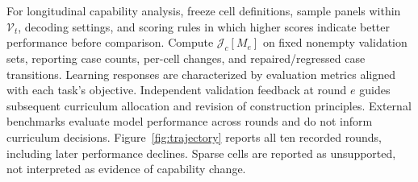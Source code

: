 For longitudinal capability analysis, freeze cell definitions, sample panels within $\mathcal V_t$, decoding settings, and scoring rules in which higher scores indicate better performance before comparison. Compute $\mathcal J_c[M_e]$ on fixed nonempty validation sets, reporting case counts, per-cell changes, and repaired/regressed case transitions. Learning responses are characterized by evaluation metrics aligned with each task's objective. Independent validation feedback at round $e$ guides subsequent curriculum allocation and revision of construction principles. External benchmarks evaluate model performance across rounds and do not inform curriculum decisions. Figure~\ref{fig:trajectory} reports all ten recorded rounds, including later performance declines. Sparse cells are reported as unsupported, not interpreted as evidence of capability change.

\paragraph{}

